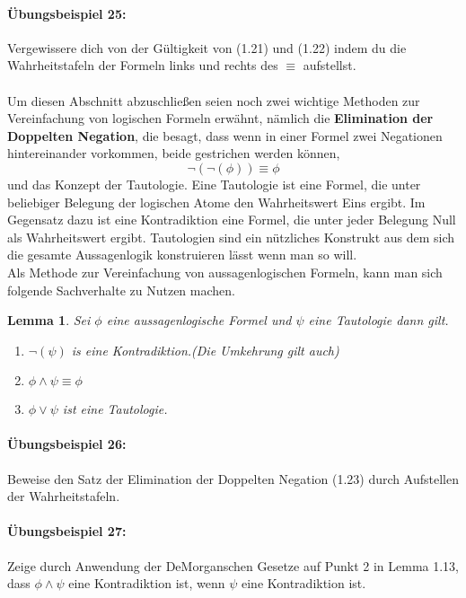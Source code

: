 \documentclass[11pt,a4paper,leqno]{report}
\newtheorem{lemma}[theorem]{Lemma}
\numberwithin{equation}{chapter}
\begin{document}
\paragraph{Übungsbeispiel 25:} Vergewissere dich von der Gültigkeit von (1.21) und (1.22) indem du die Wahrheitstafeln der Formeln links und rechts des $\equiv$ aufstellst.\\
\\
Um diesen Abschnitt abzuschließen seien noch zwei wichtige Methoden zur Vereinfachung von logischen Formeln erwähnt, nämlich die \textbf{Elimination der Doppelten Negation}, die besagt, dass wenn in einer Formel zwei Negationen hintereinander vorkommen, beide gestrichen werden können,
\begin{equation}
\neg(\neg(\phi))\equiv\phi
\end{equation}
und das Konzept der Tautologie. Eine Tautologie ist eine Formel, die unter beliebiger Belegung der logischen Atome den Wahrheitswert Eins ergibt. 
Im Gegensatz dazu ist eine Kontradiktion eine Formel, die unter jeder Belegung Null als Wahrheitswert ergibt. Tautologien sind ein nützliches Konstrukt aus dem sich die gesamte Aussagenlogik konstruieren lässt wenn man so will.\\
Als Methode zur Vereinfachung von aussagenlogischen Formeln, kann man sich folgende Sachverhalte zu Nutzen machen.
\begin{lemma}
	Sei $\phi$ eine aussagenlogische Formel und $\psi$ eine Tautologie dann gilt.
	\begin{enumerate}
		\item $\neg(\psi)$ is eine Kontradiktion.(Die Umkehrung gilt auch)
		\item $\phi\wedge\psi\equiv\phi$
		\item $\phi\vee\psi$ ist eine Tautologie.
	\end{enumerate}
\end{lemma}

\paragraph{Übungsbeispiel 26:} Beweise den Satz der Elimination der Doppelten Negation (1.23) durch Aufstellen der Wahrheitstafeln.
\paragraph{Übungsbeispiel 27:} Zeige durch Anwendung der DeMorganschen Gesetze auf Punkt 2 in Lemma 1.13, dass $\phi\wedge\psi$ eine Kontradiktion ist, wenn $\psi$ eine Kontradiktion ist.
\end{document}
